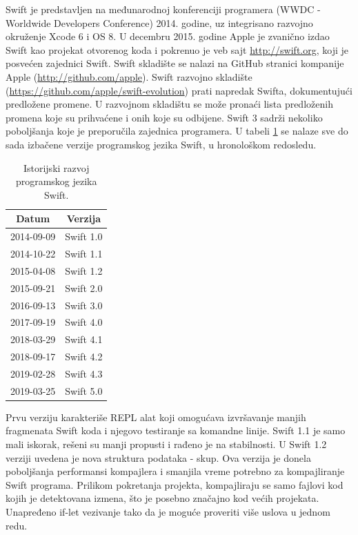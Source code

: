 \documentclass[a4paper]{article}
\begin{document}
Swift je predstavljen na međunarodnoj konferenciji programera (WWDC - Worldwide Developers Conference) 2014. godine, uz integrisano razvojno okruženje Xcode 6 i OS 8. U decembru 2015. godine Apple je zvanično izdao Swift kao projekat otvorenog koda i pokrenuo je veb sajt \url{http://swift.org}, koji je posvećen zajednici Swift. Swift skladište se nalazi na GitHub stranici kompanije Apple (\url{http://github.com/apple}). Swift razvojno skladište (\url{https://github.com/apple/swift-evolution}) prati napredak Swifta, dokumentujući predložene promene. U razvojnom skladištu se može pronaći lista predloženih promena koje su prihvaćene i onih koje su odbijene. Swift 3 sadrži nekoliko poboljšanja koje je preporučila zajednica programera. U tabeli \ref{tab:tabela1} se nalaze sve do sada izbačene verzije programskog jezika Swift, u hronološkom redosledu.

\begin{table}[h!]
\begin{center}
\caption{Istorijski razvoj programskog jezika Swift.}
\begin{tabular}{|c|c|} \hline
\label{tab:tabela1}
Datum & Verzija \\ \hline
2014-09-09 & Swift 1.0 \\ \hline
2014-10-22 & Swift 1.1 \\ \hline
2015-04-08 & Swift 1.2 \\ \hline
2015-09-21 & Swift 2.0 \\ \hline
2016-09-13 & Swift 3.0 \\ \hline
2017-09-19 & Swift 4.0 \\ \hline
2018-03-29 & Swift 4.1 \\ \hline
2018-09-17 & Swift 4.2 \\ \hline
2019-02-28 & Swift 4.3 \\ \hline
2019-03-25 & Swift 5.0 \\ \hline
\end{tabular}
\end{center}
\end{table}



Prvu verziju karakteriše REPL alat koji omogućava izvršavanje  manjih fragmenata Swift koda i njegovo testiranje sa komandne linije. Swift 1.1 je samo mali iskorak, rešeni su manji propusti i rađeno je na stabilnosti. U Swift 1.2 verziji uvedena je nova struktura podataka - skup. Ova verzija je donela poboljšanja performansi kompajlera i smanjila vreme potrebno za kompajliranje Swift programa. Prilikom pokretanja projekta, kompajliraju se samo fajlovi kod kojih je detektovana izmena, što je posebno značajno kod većih projekata. Unapređeno if-let vezivanje tako da je moguće proveriti više uslova u jednom redu.
\end{document}
